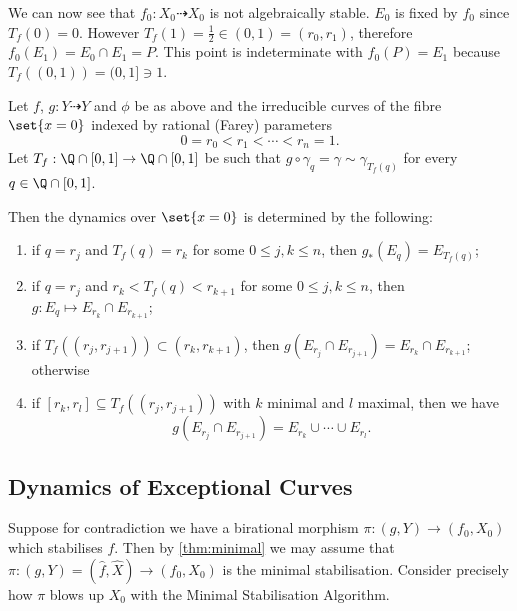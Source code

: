 \documentclass[11pt, final]{amsart}
\newcommand{\dashto}{\dashrightarrow}
\newcommand{\minimalalgname}{Minimal Stabilisation Algorithm}
\newcommand{\half}{\frac 12}
\begin{document}

\begin{ex}
 We can now see that $f_0 : X_0 \dashto X_0$ is not algebraically stable. $E_0$ is fixed by $f_0$ since $T_f(0) = 0$. However $T_f(1) = \half \in (0, 1) = (r_0, r_1)$, therefore $f_0(E_1) = E_0 \cap E_1 = P$. This point is indeterminate with $f_0(P) = E_1$ because $T_f((0, 1)) = (0, 1] \ni 1$.
\end{ex}

\begin{prop}\label{prop:mapexc}
 Let $f$, $g : Y \dashto Y$ and $\phi$ be as above and the irreducible curves of the fibre $\set{x=0}$ indexed by rational (Farey) parameters \[0 = r_0 < r_1 < \cdots < r_n = 1.\] Let $T_f : \Q \cap [0, 1] \to \Q \cap [0, 1]$ be such that $g \circ \gamma_q = \gamma \sim \gamma_{T_f(q)}$ for every $q \in \Q \cap [0, 1]$.
 
 Then the dynamics over $\set{x=0}$ is determined by the following:
\begin{enumerate}
 \item if $q = r_j$ and $T_f(q) = r_k$ for some $0 \le j, k \le n$, then $g_*(E_q) = E_{T_f(q)}$;
 \item if $q = r_j$ and $r_k < T_f(q) < r_{k+1}$ for some $0 \le j, k \le n$, then $g : E_q \mapsto E_{r_k} \cap E_{r_{k+1}}$;
 \item if $T_f((r_j, r_{j+1})) \subset (r_k, r_{k+1})$, then $g\left(E_{r_j} \cap E_{r_{j+1}}\right) = E_{r_k} \cap E_{r_{k+1}}$; otherwise
 \item if $[r_k, r_l] \subseteq T_f((r_j, r_{j+1}))$ with $k$ minimal and $l$ maximal, then we have \[g\!\left(E_{r_j} \cap E_{r_{j+1}}\right) = E_{r_k} \cup \cdots \cup E_{r_l}.\]
\end{enumerate}
\end{prop}

\subsection{Dynamics of Exceptional Curves}\label{sec:dynexc}

 Suppose for contradiction we have a birational morphism $\pi : (g, Y) \to (f_0, X_0)$ which stabilises $f$. Then by \autoref{thm:minimal} we may assume that $\pi : (g, Y) = (\hat f, \hat X) \to (f_0, X_0)$ is the minimal stabilisation. Consider precisely how $\pi$ blows up $X_0$ with the \minimalalgname{}.
\end{document}
